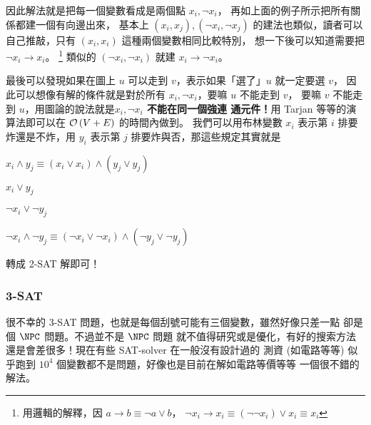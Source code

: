 \documentclass[a4paper,12pt]{book}
\begin{document}
因此解法就是把每一個變數看成是兩個點 $x_i, \lnot x_i$，
再如上面的例子所示把所有關係都建一個有向邊出來，
基本上 $(x_i, x_j), (\lnot x_i, \lnot x_j)$
的建法也類似，讀者可以自己推敲，只有 $(x_i, x_i)$ 這種兩個變數相同比較特別，
想一下後可以知道需要把 $\lnot x_i \to x_i$。
\footnote{用邏輯的解釋，因 $a \to b \equiv \lnot a \lor b$，
  $\lnot x_i \to x_i \equiv (\lnot \lnot x_i) \lor x_i \equiv x_i$
}
類似的 $(\lnot x_i, \lnot x_i)$ 就建 $x_i \to \lnot x_i$。

最後可以發現如果在圖上 $u$ 可以走到 $v$，表示如果「選了」$u$ 就一定要選 $v$，
因此可以想像有解的條件就是對於所有 $x_i, \lnot x_i$，要嘛 $u$ 不能走到 $v$，
要嘛 $v$ 不能走到 $u$，用圖論的說法就是{\bf $x_i, \lnot x_i$ 不能在同一個強連
  通元件！}用 Tarjan 等等的演算法即可以在 $\operatorname{\mathcal{O}}\left(V+E\right)$ 的時間內做到。
%
我們可以用布林變數 $x_i$ 表示第 $i$ 排要炸還是不炸，用 $y_i$ 表示第
$j$ 排要炸與否，那這些規定其實就是
  \begin{description}[leftmargin=!, labelwidth=\widthof{一一一一}]
    \item[敵方要塞] $x_i \land y_j \equiv (x_i \lor x_i) \land (y_j \lor y_j)$
    \item[敵方軍團] $x_i \lor y_j$
    \item[住宅區] $\lnot x_i \lor \lnot y_j$
    \item[醫院] $\lnot x_i \land \lnot y_j \equiv 
      (\lnot x_i \lor \lnot x_i) \land (\lnot y_j \lor \lnot y_j)$
  \end{description}
  轉成 2-SAT 解即可！

\subsubsection{3-SAT}
很不幸的 3-SAT 問題，也就是每個刮號可能有三個變數，雖然好像只差一點
卻是個 $\NPC$ 問題。不過並不是 $\NPC$ 問題
就不值得研究或是優化，有好的搜索方法還是會差很多！現在有些 SAT-solver 在一般沒有設計過的
測資 (如電路等等) 似乎跑到 $10^4$ 個變數都不是問題，好像也是目前在解如電路等價等等
一個很不錯的解法。
\end{document}
